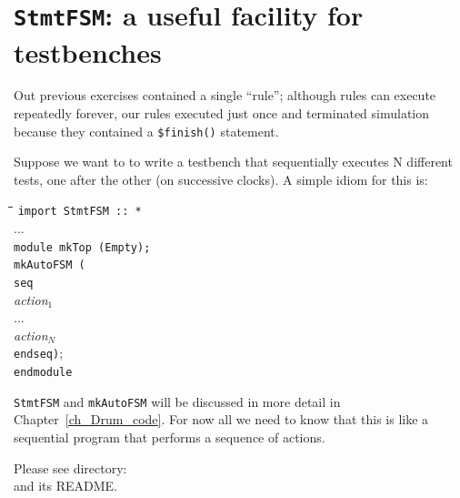 
\section{{\tt StmtFSM}: a useful facility for testbenches}

\label{BSV_small_testbench}


Out previous exercises contained a single ``rule''; although rules can
execute repeatedly forever, our rules executed just once and
terminated simulation because they contained a \verb|$finish()|
statement.

Suppose we want to to write a testbench that sequentially executes N
different tests, one after the other (on successive clocks).  A simple
idiom for this is:

{\footnotesize
\begin{tabbing}
\hmmm \= \hm \= \hm \= \hm \= \kill
      \> {\tt import StmtFSM :: *} \\
      \> ... \\
      \> {\tt module mkTop (Empty);} \\
      \>     \> {\tt mkAutoFSM (} \\
      \>     \>     \> {\tt seq} \\
      \>     \>     \>     \> \emph{action$_1$} \\
      \>     \>     \>     \> ... \\
      \>     \>     \>     \> \emph{action$_N$} \\
      \>     \>     \> {\tt endseq)}; \\
      \> {\tt endmodule}
\end{tabbing}}

{\tt StmtFSM} and \verb|mkAutoFSM| will be discussed in more detail in
Chapter~\ref{ch_Drum_code}.  For now all we need to know that this is
like a sequential program that performs a sequence of actions.

\Beginexercise

Please see directory:  \\
and its README.
\Endexercise


